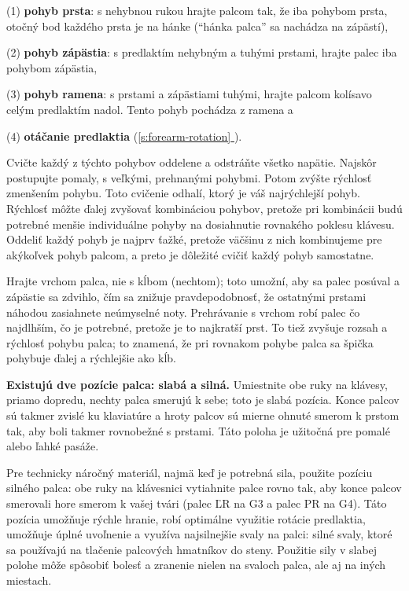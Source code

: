 \documentclass[11pt,a4paper]{book}
\newcommand*{\fullref}[1]{\hyperref[{#1}]{\ref*{#1} \nameref*{#1}}} %
\begin{document}
(1) \textbf{pohyb prsta}: s nehybnou rukou hrajte palcom tak, že iba pohybom prsta, otočný bod každého prsta je na hánke (“hánka palca” sa nachádza na zápästí),

(2) \textbf{pohyb zápästia}: s predlaktím nehybným a tuhými prstami, hrajte palec iba pohybom zápästia,

(3) \textbf{pohyb ramena}: s prstami a zápästiami tuhými, hrajte palcom kolísavo  celým predlaktím nadol. Tento pohyb pochádza z ramena a

(4) \textbf{otáčanie predlaktia} (\fullref{s:forearm-rotation}).

Cvičte každý z týchto pohybov oddelene a odstráňte všetko napätie. Najskôr postupujte pomaly, s veľkými, prehnanými pohybmi. Potom zvýšte rýchlosť zmenšením pohybu. Toto cvičenie odhalí, ktorý je váš najrýchlejší pohyb. Rýchlosť môžte ďalej zvyšovať kombináciou pohybov, pretože pri kombinácii budú potrebné menšie individuálne pohyby na dosiahnutie rovnakého poklesu klávesu. Oddeliť každý pohyb je najprv ťažké, pretože väčšinu z nich kombinujeme pre akýkoľvek pohyb palcom, a preto je dôležité cvičiť každý pohyb samostatne.

Hrajte vrchom palca, nie s kĺbom (nechtom); toto umožní, aby sa palec posúval a zápästie sa zdvihlo, čím sa znižuje pravdepodobnosť, že ostatnými prstami náhodou zasiahnete neúmyselné noty. Prehrávanie s vrchom robí palec čo najdlhším, čo je potrebné, pretože je to najkratší prst. To tiež zvyšuje rozsah a rýchlosť pohybu palca; to znamená, že pri rovnakom pohybe palca sa špička pohybuje ďalej a rýchlejšie ako kĺb.

\textbf{Existujú dve pozície palca: slabá a silná.} Umiestnite obe ruky na klávesy, priamo dopredu, nechty palca smerujú k sebe; toto je slabá pozícia. Konce palcov sú takmer zvislé ku klaviatúre a hroty palcov sú mierne ohnuté smerom k prstom tak, aby boli takmer rovnobežné s prstami. Táto poloha je užitočná pre pomalé alebo ľahké pasáže.

Pre technicky náročný materiál, najmä keď je potrebná sila, použite pozíciu silného palca: obe ruky na klávesnici vytiahnite palce rovno tak, aby konce palcov smerovali hore smerom k vašej tvári (palec ĽR na G3 a palec PR na G4). Táto pozícia umožňuje rýchle hranie, robí optimálne využitie rotácie predlaktia, umožňuje úplné uvoľnenie a využíva najsilnejšie svaly na palci: silné svaly, ktoré sa používajú na tlačenie palcových hmatníkov do steny. Použitie sily v slabej polohe môže spôsobiť bolesť a zranenie nielen na svaloch palca, ale aj na iných miestach.
\end{document}
